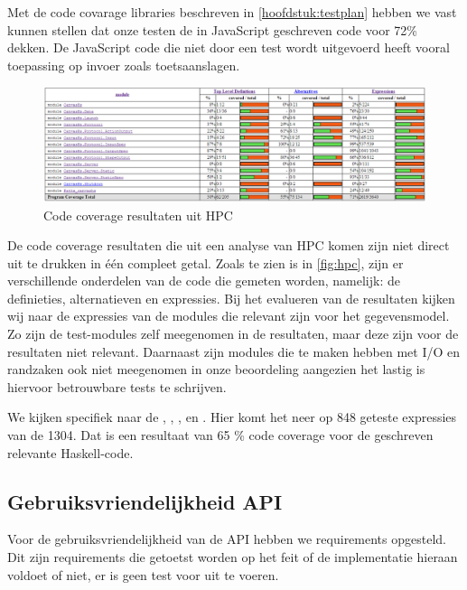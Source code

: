 Met de code covarage libraries beschreven in \autoref{hoofdstuk:testplan} hebben we vast kunnen stellen dat onze testen de in JavaScript geschreven code voor 72\% dekken. De JavaScript code die niet door een test wordt uitgevoerd heeft vooral toepassing op invoer zoals toetsaanslagen.

\begin{figure}
\begin{center}
\includegraphics[keepaspectratio,width=\textwidth]{./images/haskellcoverage.png}
\caption{Code coverage resultaten uit HPC}
\label{fig:hpc}
\end{center}
\end{figure}

De code coverage resultaten die uit een analyse van HPC komen zijn niet direct uit te drukken in één compleet getal. Zoals te zien is in \autoref{fig:hpc}, zijn er verschillende onderdelen van de code die gemeten worden, namelijk: de definieties, alternatieven en expressies. Bij het evalueren van de resultaten kijken wij naar de expressies van de modules die relevant zijn voor het gegevensmodel. Zo zijn de test-modules zelf meegenomen in de resultaten, maar deze zijn voor de resultaten niet relevant. Daarnaast zijn modules die te maken hebben met I/O en randzaken ook niet meegenomen in onze beoordeling aangezien het lastig is hiervoor betrouwbare tests te schrijven.

We kijken specifiek naar de , , ,  en . Hier komt het neer op 848 geteste expressies van de 1304. Dat is een resultaat van 65 \% code coverage voor de geschreven relevante Haskell-code.

\subsection{Gebruiksvriendelijkheid API}
Voor de gebruiksvriendelijkheid van de API hebben we requirements opgesteld. Dit zijn requirements die getoetst worden op het feit of de implementatie hieraan voldoet of niet, er is geen test voor uit te voeren.

